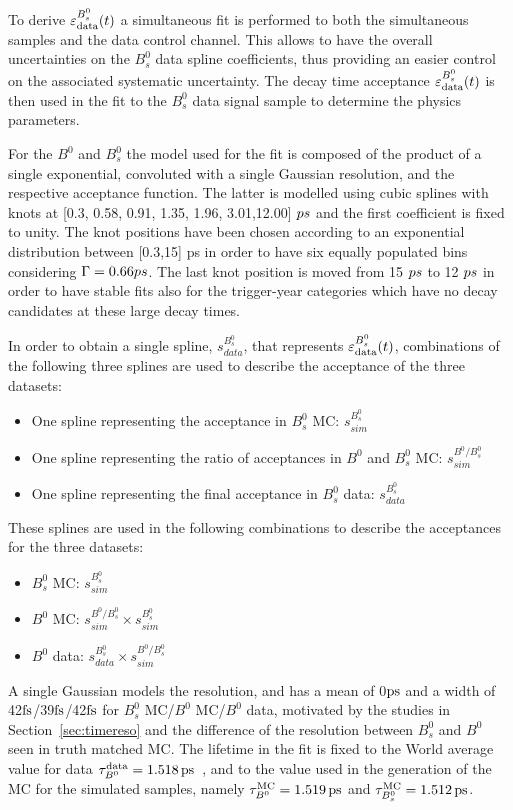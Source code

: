 To derive $\varepsilon_{\rm data}^{B_s^0}(t)$ a simultaneous fit is performed to both the simultaneous samples and the data control channel. This allows to have the overall uncertainties on the $B^0_s$ data spline coefficients, thus providing an easier control on the associated systematic uncertainty. The decay time acceptance $\varepsilon_{\rm data}^{B_s^0}(t)$ is then used in the fit to the $B^0_s$ data signal sample to determine the physics parameters.

For the $B^0$ and $B_s^0$ the model used for the fit is composed of the product of a single exponential, convoluted with a single Gaussian resolution, and the respective acceptance function. The latter is modelled using cubic splines with knots at [0.3, 0.58, 0.91, 1.35, 1.96, 3.01,12.00] $ps$ and the first coefficient is fixed to unity. The knot positions have been chosen according to an exponential distribution between [0.3,15] ps in order to have six equally populated bins considering $\Gamma=0.66ps$. The last knot position is moved from 15 $ps$ to 12 $ps$ in order to have stable fits also for the trigger-year categories which have no decay candidates at these large decay times.

In order to obtain a single spline, $s_{data}^{B_s^0}$, that represents $\varepsilon_{\rm data}^{B_s^0}(t)$, combinations of the following three splines are used to describe the acceptance of the three datasets:
\begin{itemize}
\item One spline representing the acceptance in $B_s^0$ MC: $s_{sim}^{B_s^0}$
\item One spline representing the ratio of acceptances in $B^0$ and $B_s^0$ MC: $s_{sim}^{B^0/B_s^0}$
\item One spline representing the final acceptance in $B_s^0$ data: $s_{data}^{B_s^0}$
\end{itemize}
These splines are used in the following combinations to describe the acceptances for the three datasets:
\begin{itemize}
\item $B_s^0$ MC: $s_{sim}^{B_s^0}$
\item $B^0$ MC: $s_{sim}^{B^0/B_s^0} \times s_{sim}^{B_s^0}$
\item $B^0$ data: $s_{data}^{B_s^0} \times s_{sim}^{B^0/B_s^0}$
\end{itemize}

A single Gaussian models the resolution, and has a mean of 0$\rm ps$ and a width of 42$\rm fs$/39$\rm fs$/42$\rm fs$ for $B_s^0$ MC/$B^0$ MC/$B^0$ data, motivated by the studies in Section~\ref{sec:timereso} and the difference of the resolution between $B_s^0$ and $B^0$ seen in truth matched MC. The lifetime in the fit is fixed to the World average value for data $\tau_{B^0}^{\mathrm{data}} = 1.518\,\rm ps$~\cite{HFLAV2017}, and to the value used in the generation of the MC for the simulated samples, namely $\tau_{B^0}^{\mathrm{MC}} = 1.519\,\rm ps$ and $\tau_{B^0_s}^{\mathrm{MC}} = 1.512\,\rm ps$.

